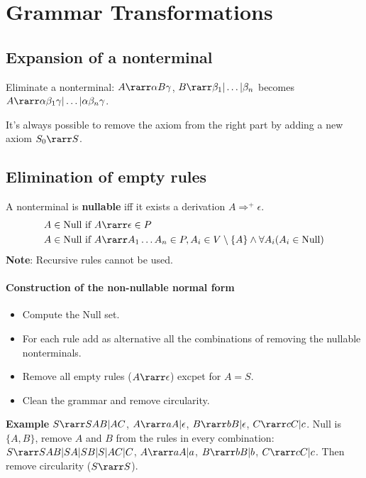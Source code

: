 \section{Grammar Transformations}

\subsection{Expansion of a nonterminal}
Eliminate a nonterminal: $A \rarr \alpha B \gamma$, $B \rarr \beta_1 | \ldots | \beta_n$ becomes $A \rarr \alpha \beta_1 \gamma | \ldots | \alpha \beta_n \gamma$.

It's always possible to remove the axiom from the right part by adding a new axiom $S_0 \rarr S$.

\subsection{Elimination of empty rules}
A nonterminal is \textbf{nullable} iff it exists a derivation $A \Rightarrow^+ \epsilon$.
\begin{align*}
    A \in \text{Null} &\text{ if }A \rarr \epsilon \in P \\
    A \in \text{Null} &\text{ if } A \rarr A_1\ldots A_n \in P, A_i \in V \setminus \{A\} \land \forall A_i (A_i \in \text{Null})
\end{align*}
\textbf{Note}: Recursive rules cannot be used.

\paragraph{Construction of the non-nullable normal form}
\begin{itemize}
    \item Compute the Null set.
    \item For each rule add as alternative all the combinations of removing the nullable nonterminals.
    \item Remove all empty rules ($A \rarr \epsilon$) excpet for $A = S$.
    \item Clean the grammar and remove circularity.
\end{itemize}

\textbf{Example} $S \rarr SAB | AC$, $A \rarr aA | \epsilon$, $B \rarr bB | \epsilon$, $C \rarr cC | c$. Null is $\{A, B\}$, remove $A$ and $B$ from the rules in every combination: $S \rarr SAB | SA | SB | S | AC | C$, $A \rarr aA | a$, $B \rarr bB | b$, $C \rarr cC | c$. Then remove circularity ($S \rarr S$).

